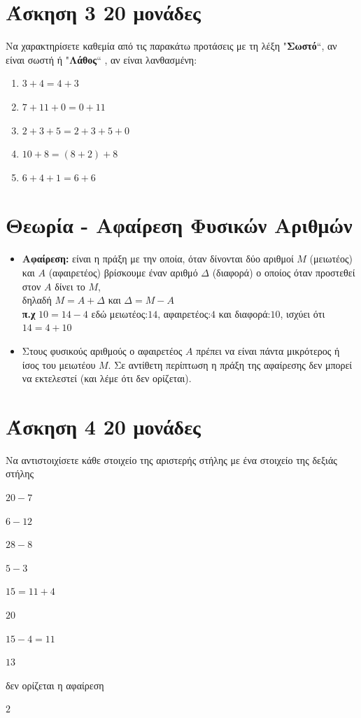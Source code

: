 \documentclass[a4paper,10pt]{report}
\begin{document}
\section*{Άσκηση 3  \hfill \small{} 20 μονάδες}
Να χαρακτηρίσετε καθεμία από τις παρακάτω προτάσεις με τη λέξη "\textbf{Σωστό}``, αν είναι σωστή ή  
"\textbf{Λάθος}`` , αν είναι λανθασμένη:
\begin{enumerate}[1)]
 \item $3+4=4+3$
 \item $7+11+0=0+11$
 \item $2+3+5=2+3+5+0$
 \item $10+8=(8+2)+8$
 \item $6+4+1=6+6$
\end{enumerate}

\section*{Θεωρία - Αφαίρεση Φυσικών Αριθμών \hfill \small{}}
\begin{itemize}
 \item \textbf{Αφαίρεση:} είναι η πράξη με την οποία, όταν δίνονται δύο αριθμοί $Μ$ (μειωτέος) και $Α$ (αφαιρετέος) 
        βρίσκουμε έναν αριθμό $Δ$ (διαφορά) ο οποίος όταν προστεθεί στον $Α$ δίνει το $Μ$,\\
        δηλαδή $Μ=Α+Δ$ και $Δ=Μ-Α$\\
 \textbf{π.χ} $10=14-4$ εδώ μειωτέος:$14$, αφαιρετέος:$4$ και διαφορά:$10$, ισχύει ότι $14=4+10$
 \item Στους φυσικούς αριθμούς ο αφαιρετέος $Α$ πρέπει να είναι πάντα μικρότερος ή ίσος του μειωτέου $Μ$. Σε αντίθετη 
       περίπτωση η πράξη της αφαίρεσης δεν μπορεί να εκτελεστεί (και λέμε ότι δεν ορίζεται).
\end{itemize}


\section*{Άσκηση 4  \hfill \small{} 20 μονάδες}
Να αντιστοιχίσετε κάθε στοιχείο της αριστερής στήλης με ένα στοιχείο της δεξιάς στήλης
\begin{itemize}
\begin{multicols}{2}
 \item $20-7$
 \item $6-12$
 \item $28-8$
 \item $5-3$
 \item $15=11+4$
 \item $20$
 \item $15-4=11$
 \item $13$
 \item δεν ορίζεται η αφαίρεση
 \item $2$
\end{multicols}
\end{itemize}

 









\end{document}
